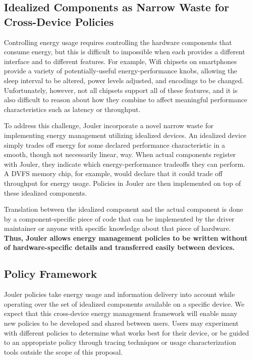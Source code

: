\subsection{Idealized Components as Narrow Waste for Cross-Device Policies}

Controlling energy usage requires controlling the hardware components that
consume energy, but this is difficult to impossible when each provides a
different interface and to different features. For example, Wifi chipsets on
smartphones provide a variety of potentially-useful energy-performance knobs,
allowing the sleep interval to be altered, power levels adjusted, and
encodings to be changed. Unfortunately, however, not all chipsets support all
of these features, and it is also difficult to reason about how they combine
to affect meaningful performance characteristics such as latency or
throughput.

To address this challenge, Jouler incorporate a novel narrow waste for
implementing energy management utilizing idealized devices. An idealized
device simply trades off energy for some declared performance characteristic
in a smooth, though not necessarily linear, way. When actual components
register with Jouler, they indicate which energy-performance tradeoffs they
can perform. A DVFS memory chip, for example, would declare that it could
trade off throughput for energy usage. Policies in Jouler are then
implemented on top of these idealized components.

Translation between the idealized component and the actual component is done
by a component-specific piece of code that can be implemented by the driver
maintainer or anyone with specific knowledge about that piece of hardware.
\textbf{Thus, Jouler allows energy management policies to be written without
of hardware-specific details and transferred easily between devices.}

\subsection{Policy Framework}

Jouler policies take energy usage and information delivery into account while
operating over the set of idealized components available on a specific
device. We expect that this cross-device energy management framework will
enable many new policies to be developed and shared between users. Users may
experiment with different policies to determine what works best for their
device, or be guided to an appropriate policy through tracing techniques or
usage characterization tools outside the scope of this proposal.

